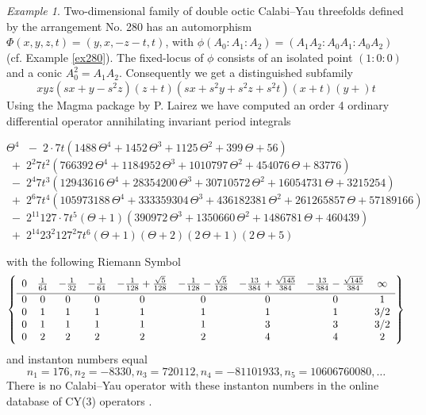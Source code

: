 \documentclass[12pt]{amsart}
\theoremstyle{plain}
\theoremstyle{remark}
\newtheorem{exmp}{Example}
\theoremstyle{definition}
\numberwithin{table}{section}
\begin{document}
\begin{exmp}
	Two-dimensional family of double octic Calabi--Yau threefolds defined by the arrangement No. 280 has an automorphism $\Phi(x,y,z,t) = (y,x,-z-t,t)$, with $\phi(A_{0}:A_{1}:A_{2}) = (A_{1}A_{2}:A_{0}A_{1}:A_{0}A_{2})$ (cf. Example \ref{ex280}).
	The fixed-locus of $\phi$ consists of an isolated point $(1:0:0)$ and a conic $A_{0}^{2}=A_{1}A_{2}$. Consequently we get a distinguished subfamily
	\[xyz(sx + y - s^{2}z) (z + t) (sx + s^{2}y + s^{2}z + s^{2}t) (x + t) (y + )t\]
	  Using the Magma package by P. Lairez \cite{Lairez} we have computed an order 4 ordinary differential operator annihilating invariant period integrals
	\begin{center}
		\(\displaystyle {\Theta}^{4}\)
		\mbox{\(\displaystyle\; - \; 2  \cdot  7 t(1488\,{\Theta}^{4}+1452\,{\Theta}^{3}+1125\,{\Theta}^{2}+399\,\Theta+56)\)}
		\mbox{\(\displaystyle\; + \; 2 ^{2} 7 t^{2}(766392\,{\Theta}^{4}+1184952\,{\Theta}^{3}+1010797\,{\Theta}^{2}+454076\,\Theta+83776)\)}
		\mbox{\(\displaystyle\; - \; 2 ^{4} 7 t^{3}(12943616\,{\Theta}^{4}+28354200\,{\Theta}^{3}+30710572\,{\Theta}^{2}+16054731\,\Theta+3215254)\)}
		\mbox{\(\displaystyle\; + \; 2 ^{6} 7 t^{4}(105973188\,{\Theta}^{4}+333359304\,{\Theta}^{3}+436182381\,{\Theta}^{2}+261265857\,\Theta+57189166)\)}
		\mbox{\(\displaystyle\; - \; 2 ^{11} 127  \cdot  7 t^{5}(\Theta+1)(390972\,{\Theta}^{3}+1350660\,{\Theta}^{2}+1486781\,\Theta+460439)\)}
		\mbox{\(\displaystyle\; + \; 2 ^{14} 23 ^{2} 127 ^{2} 7 t^{6}(\Theta+1)(\Theta+2)(2\,\Theta+1)(2\,\Theta+5)\)}
	\end{center}
with the following Riemann Symbol
	\[\left\{\begin{array}{*{9}c}
	0& {\frac{1}{64}}& -\frac1{32}& -{\frac{1}{64}}& -{\frac{1}{128}}+{\frac {\sqrt {5}}{128}}& -{\frac{1}{128}}-{\frac {\sqrt {5}}{128}}& -{\frac{13}{384}}+{\frac {\sqrt {145}}{384}}& -{\frac{13}{384}}-{\frac {\sqrt {145}}{384}}& \infty \\[1mm]
	\hline0 & 0 & 0 & 0 & 0 & 0 & 0 & 0 & 1 \\
	0 & 1 & 1 & 1 & 1 & 1 & 1 & 1 & 3/2 \\
	0 & 1 & 1 & 1 & 1 & 1 & 3 & 3 & 3/2 \\
	0 & 2 & 2 & 2 & 2 & 2 & 4 & 4 & 2 \\
	\end{array}\right\}\]
	and instanton numbers equal
	\[n_{1}=176, n_{2}=-8330, n_{3}=720112, n_{4}=-81101933, n_{5}=10606760080,\dots\]
	There is no Calabi--Yau operator with these instanton numbers in the online database of CY(3) operators \cite{CYDB}.
\end{exmp}
\end{document}

